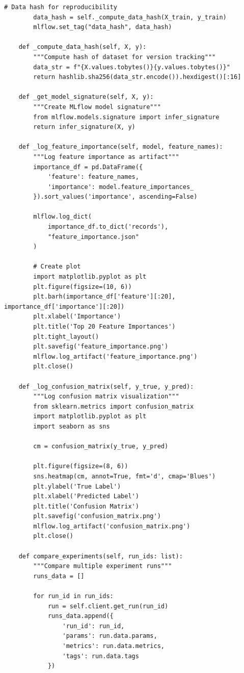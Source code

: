 \begin{lstlisting}[style=python, caption=Comprehensive MLflow experiment tracking]
        # Data hash for reproducibility
        data_hash = self._compute_data_hash(X_train, y_train)
        mlflow.set_tag("data_hash", data_hash)

    def _compute_data_hash(self, X, y):
        """Compute hash of dataset for version tracking"""
        data_str = f"{X.values.tobytes()}{y.values.tobytes()}"
        return hashlib.sha256(data_str.encode()).hexdigest()[:16]

    def _get_model_signature(self, X, y):
        """Create MLflow model signature"""
        from mlflow.models.signature import infer_signature
        return infer_signature(X, y)

    def _log_feature_importance(self, model, feature_names):
        """Log feature importance as artifact"""
        importance_df = pd.DataFrame({
            'feature': feature_names,
            'importance': model.feature_importances_
        }).sort_values('importance', ascending=False)

        mlflow.log_dict(
            importance_df.to_dict('records'),
            "feature_importance.json"
        )

        # Create plot
        import matplotlib.pyplot as plt
        plt.figure(figsize=(10, 6))
        plt.barh(importance_df['feature'][:20], importance_df['importance'][:20])
        plt.xlabel('Importance')
        plt.title('Top 20 Feature Importances')
        plt.tight_layout()
        plt.savefig('feature_importance.png')
        mlflow.log_artifact('feature_importance.png')
        plt.close()

    def _log_confusion_matrix(self, y_true, y_pred):
        """Log confusion matrix visualization"""
        from sklearn.metrics import confusion_matrix
        import matplotlib.pyplot as plt
        import seaborn as sns

        cm = confusion_matrix(y_true, y_pred)

        plt.figure(figsize=(8, 6))
        sns.heatmap(cm, annot=True, fmt='d', cmap='Blues')
        plt.ylabel('True Label')
        plt.xlabel('Predicted Label')
        plt.title('Confusion Matrix')
        plt.savefig('confusion_matrix.png')
        mlflow.log_artifact('confusion_matrix.png')
        plt.close()

    def compare_experiments(self, run_ids: list):
        """Compare multiple experiment runs"""
        runs_data = []

        for run_id in run_ids:
            run = self.client.get_run(run_id)
            runs_data.append({
                'run_id': run_id,
                'params': run.data.params,
                'metrics': run.data.metrics,
                'tags': run.data.tags
            })


\end{lstlisting}
